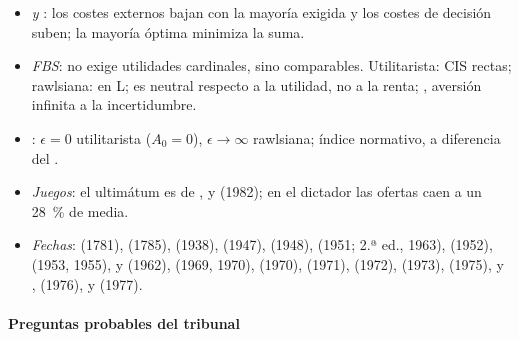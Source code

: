 \documentclass[11pt]{article}
\begin{document}
\begin{itemize}
\item \emph{ y }: los costes externos bajan con la mayoría exigida y los costes de decisión suben; la mayoría óptima minimiza la suma.
\item \emph{FBS}: no exige utilidades cardinales, sino comparables. Utilitarista: CIS rectas; rawlsiana: en L;  es neutral respecto a la utilidad, no a la renta; , aversión infinita a la incertidumbre.
\item \emph{}: $\epsilon=0$ utilitarista ($A_0=0$), $\epsilon\to\infty$ rawlsiana; índice normativo, a diferencia del .
\item \emph{Juegos}: el ultimátum es de ,  y  (1982); en el dictador las ofertas caen a un 28~\% de media\nocite{GuthSchmittbergerSchwarze1982Ultimatum,Engel2011Dictator}.
\item \emph{Fechas}:  (1781),  (1785),  (1938),  (1947),  (1948),  (1951; 2.ª ed., 1963),  (1952),  (1953, 1955),  y  (1962),  (1969, 1970),  (1970),  (1971),  (1972),  (1973),  (1975),  y ,  (1976),  y  (1977).
\end{itemize}

\paragraph{Preguntas probables del tribunal}
\end{document}
